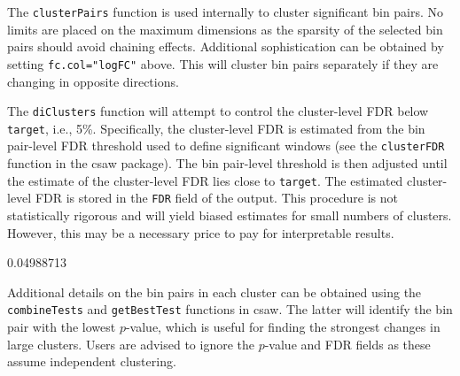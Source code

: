 \documentclass[12pt]{report}
\renewenvironment{Schunk}{\vspace{0pt}}{\vspace{0pt}}
\newcommand{\csaw}{csaw}
\newcommand{\code}[1]{{\small\texttt{#1}}}
\begin{document}
The \code{clusterPairs} function is used internally to cluster significant bin pairs. 
No limits are placed on the maximum dimensions as the sparsity of the selected bin pairs should avoid chaining effects.
Additional sophistication can be obtained by setting \code{fc.col="logFC"} above.
This will cluster bin pairs separately if they are changing in opposite directions.

The \code{diClusters} function will attempt to control the cluster-level FDR below \code{target}, i.e., 5\%.
Specifically, the cluster-level FDR is estimated from the bin pair-level FDR threshold used to define significant windows (see the \code{clusterFDR} function in the \csaw{} package).
The bin pair-level threshold is then adjusted until the estimate of the cluster-level FDR lies close to \code{target}.
The estimated cluster-level FDR is stored in the \code{FDR} field of the output.
This procedure is not statistically rigorous and will yield biased estimates for small numbers of clusters.
However, this may be a necessary price to pay for interpretable results.

\begin{Schunk}
\begin{Soutput}
[1] 0.04988713
\end{Soutput}
\end{Schunk}

Additional details on the bin pairs in each cluster can be obtained using the \code{combineTests} and \code{getBestTest} functions in \csaw{}.
The latter will identify the bin pair with the lowest $p$-value, which is useful for finding the strongest changes in large clusters.
Users are advised to ignore the $p$-value and FDR fields as these assume independent clustering.
\end{document}
